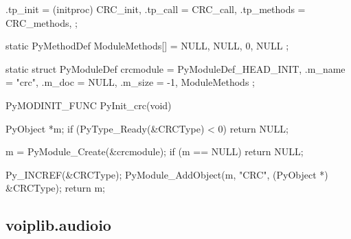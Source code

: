 \begin{pythoncode}
{    .tp_init = (initproc) CRC_init,
    .tp_call = CRC_call,
    .tp_methods = CRC_methods,
};

static PyMethodDef ModuleMethods[] = {
    {NULL, NULL, 0, NULL}
};

static struct PyModuleDef crcmodule = {
    PyModuleDef_HEAD_INIT,
    .m_name = "crc",
    .m_doc = NULL,
    .m_size = -1,
    ModuleMethods
};

PyMODINIT_FUNC PyInit_crc(void) {
    PyObject *m;
    if (PyType_Ready(&CRCType) < 0)
        return NULL;

    m = PyModule_Create(&crcmodule);
    if (m == NULL)
        return NULL;

    Py_INCREF(&CRCType);
    PyModule_AddObject(m, "CRC", (PyObject *) &CRCType);
    return m;
}
\end{pythoncode}
\subsection{voiplib.audioio}
